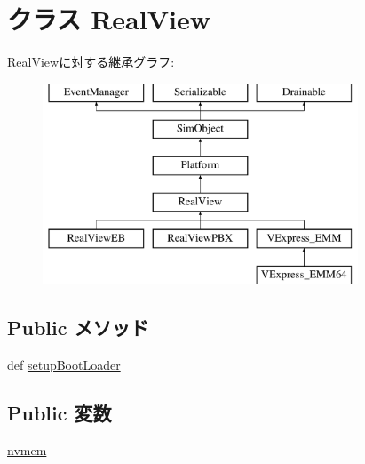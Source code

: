 \hypertarget{classRealView_1_1RealView}{
\section{クラス RealView}
\label{classRealView_1_1RealView}
}
RealViewに対する継承グラフ:\begin{figure}[H]
\begin{center}
\leavevmode
\includegraphics[height=6cm]{classRealView_1_1RealView}
\end{center}
\end{figure}
\subsection*{Public メソッド}
\begin{DoxyCompactItemize}
\item 
def \hyperlink{classRealView_1_1RealView_a2bb8c2dabea2e4801ca416188787ef11}{setupBootLoader}
\end{DoxyCompactItemize}
\subsection*{Public 変数}
\begin{DoxyCompactItemize}
\item 
\hyperlink{classRealView_1_1RealView_abcf52781f9ca2926e1f879ceecb4865c}{nvmem}
\end{DoxyCompactItemize}
